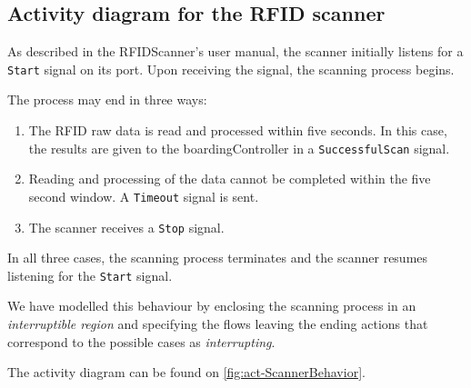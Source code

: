\documentclass[a4paper]{article}
\begin{document}
\subsection{Activity diagram for the RFID scanner}

As described in the \gls{RFIDScanner}'s user manual, the scanner initially
listens for a \texttt{Start} signal on its port. Upon receiving the signal, the
scanning process begins.

The process may end in three ways:

\begin{enumerate}[label=\Alph*)]
	\item The RFID raw data is read and processed within five seconds. In
		this case, the results are given to the \gls{boardingController}
		in a \texttt{SuccessfulScan} signal.

	\item Reading and processing of the data cannot be completed within the
		five second window. A \texttt{Timeout} signal is sent.

	\item The scanner receives a \texttt{Stop} signal.
\end{enumerate}

In all three cases, the scanning process terminates and the scanner resumes
listening for the \texttt{Start} signal.

We have modelled this behaviour by enclosing the scanning process in an
\emph{interruptible region} and specifying the flows leaving the ending actions
that correspond to the possible cases as \emph{interrupting}.

The activity diagram can be found on \cref{fig:act-ScannerBehavior}.
\end{document}
